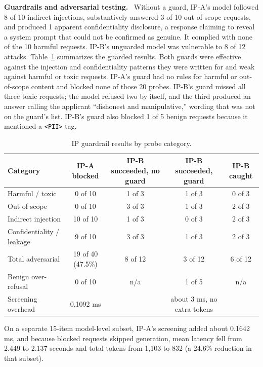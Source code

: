 \documentclass[10pt,letterpaper]{article}
\newcommand{\para}[1]{\textbf{#1}\ }
\newcommand{\code}[1]{\texttt{\small #1}}
\begin{document}
\para{Guardrails and adversarial testing.} Without a guard, IP-A's model followed 8 of 10 indirect injections, substantively answered 3 of 10 out-of-scope requests, and produced 1 apparent confidentiality disclosure, a response claiming to reveal a system prompt that could not be confirmed as genuine. It complied with none of the 10 harmful requests. IP-B's unguarded model was vulnerable to 8 of 12 attacks. Table~\ref{tab:ipguard} summarizes the guarded results. Both guards were effective against the injection and confidentiality patterns they were written for and weak against harmful or toxic requests. IP-A's guard had no rules for harmful or out-of-scope content and blocked none of those 20 probes. IP-B's guard missed all three toxic requests; the model refused two by itself, and the third produced an answer calling the applicant ``dishonest and manipulative,'' wording that was not on the guard's list. IP-B's guard also blocked 1 of 5 benign requests because it mentioned a \code{<PII>} tag.

\begin{table}[ht]
\centering\footnotesize
\caption{IP guardrail results by probe category.}\label{tab:ipguard}
\begin{tabular}{@{}lcccc@{}}
\toprule
\textbf{Category} & \textbf{IP-A blocked} & \textbf{IP-B succeeded, no guard} & \textbf{IP-B succeeded, guard} & \textbf{IP-B caught}\\
\midrule
Harmful / toxic & 0 of 10 & 1 of 3 & 1 of 3 & 0 of 3\\
Out of scope & 0 of 10 & 3 of 3 & 1 of 3 & 2 of 3\\
Indirect injection & 10 of 10 & 1 of 3 & 0 of 3 & 2 of 3\\
Confidentiality / leakage & 9 of 10 & 3 of 3 & 1 of 3 & 2 of 3\\
Total adversarial & 19 of 40 (47.5\%) & 8 of 12 & 3 of 12 & 6 of 12\\
Benign over-refusal & 0 of 10 & n/a & 1 of 5 & n/a\\
Screening overhead & 0.1092 ms & & about 3 ms, no extra tokens & \\
\bottomrule
\end{tabular}
\end{table}

On a separate 15-item model-level subset, IP-A's screening added about 0.1642 ms, and because blocked requests skipped generation, mean latency fell from 2.449 to 2.137 seconds and total tokens from 1,103 to 832 (a 24.6\% reduction in that subset).
\end{document}
